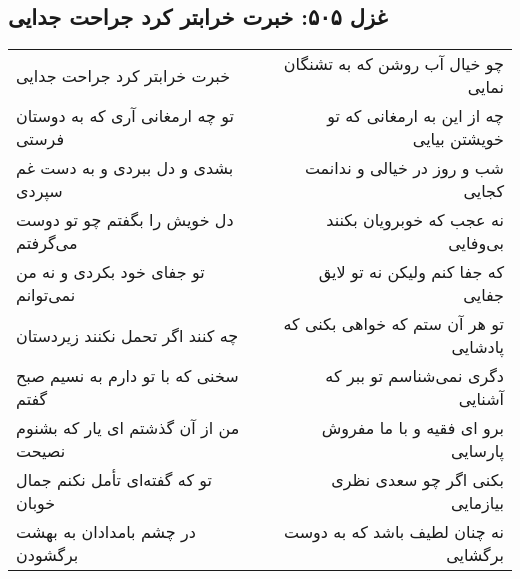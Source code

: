 \begin{center}
\section*{غزل ۵۰۵: خبرت خرابتر کرد جراحت جدایی}
\label{sec:505}
\begin{longtable}{l p{0.5cm} r}
خبرت خرابتر کرد جراحت جدایی
&&
چو خیال آب روشن که به تشنگان نمایی
\\
تو چه ارمغانی آری که به دوستان فرستی
&&
چه از این به ارمغانی که تو خویشتن بیایی
\\
بشدی و دل ببردی و به دست غم سپردی
&&
شب و روز در خیالی و ندانمت کجایی
\\
دل خویش را بگفتم چو تو دوست می‌گرفتم
&&
نه عجب که خوبرویان بکنند بی‌وفایی
\\
تو جفای خود بکردی و نه من نمی‌توانم
&&
که جفا کنم ولیکن نه تو لایق جفایی
\\
چه کنند اگر تحمل نکنند زیردستان
&&
تو هر آن ستم که خواهی بکنی که پادشایی
\\
سخنی که با تو دارم به نسیم صبح گفتم
&&
دگری نمی‌شناسم تو ببر که آشنایی
\\
من از آن گذشتم ای یار که بشنوم نصیحت
&&
برو ای فقیه و با ما مفروش پارسایی
\\
تو که گفته‌ای تأمل نکنم جمال خوبان
&&
بکنی اگر چو سعدی نظری بیازمایی
\\
در چشم بامدادان به بهشت برگشودن
&&
نه چنان لطیف باشد که به دوست برگشایی
\\
\end{longtable}
\end{center}

